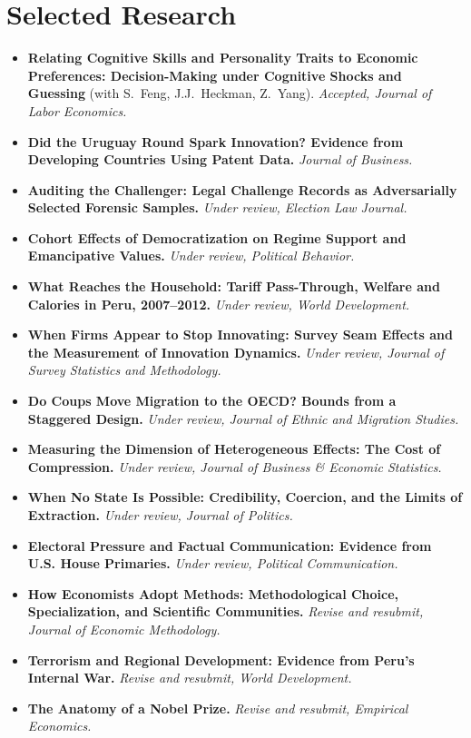 \documentclass[11pt]{article}
\begin{document}
\section{Selected Research}
\begin{itemize}
\item \textbf{Relating Cognitive Skills and Personality Traits to Economic Preferences: Decision-Making under Cognitive Shocks and Guessing} (with S.\ Feng, J.J.\ Heckman, Z.\ Yang). \textit{Accepted, Journal of Labor Economics.}
\item \textbf{Did the Uruguay Round Spark Innovation? Evidence from Developing Countries Using Patent Data.} \textit{Journal of Business.}
\item \textbf{Auditing the Challenger: Legal Challenge Records as Adversarially Selected Forensic Samples.} \textit{Under review, Election Law Journal.}
\item \textbf{Cohort Effects of Democratization on Regime Support and Emancipative Values.} \textit{Under review, Political Behavior.}
\item \textbf{What Reaches the Household: Tariff Pass-Through, Welfare and Calories in Peru, 2007--2012.} \textit{Under review, World Development.}
\item \textbf{When Firms Appear to Stop Innovating: Survey Seam Effects and the Measurement of Innovation Dynamics.} \textit{Under review, Journal of Survey Statistics and Methodology.}
\item \textbf{Do Coups Move Migration to the OECD? Bounds from a Staggered Design.} \textit{Under review, Journal of Ethnic and Migration Studies.}
\item \textbf{Measuring the Dimension of Heterogeneous Effects: The Cost of Compression.} \textit{Under review, Journal of Business \& Economic Statistics.}
\item \textbf{When No State Is Possible: Credibility, Coercion, and the Limits of Extraction.} \textit{Under review, Journal of Politics.}
\item \textbf{Electoral Pressure and Factual Communication: Evidence from U.S. House Primaries.} \textit{Under review, Political Communication.}
\item \textbf{How Economists Adopt Methods: Methodological Choice, Specialization, and Scientific Communities.} \textit{Revise and resubmit, Journal of Economic Methodology.}
\item \textbf{Terrorism and Regional Development: Evidence from Peru's Internal War.} \textit{Revise and resubmit, World Development.}
\item \textbf{The Anatomy of a Nobel Prize.} \textit{Revise and resubmit, Empirical Economics.}
\end{itemize}
\end{document}
